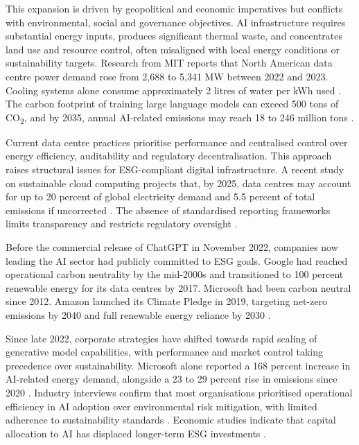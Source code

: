\documentclass[oneside,10pt]{swissi}
\begin{document}
This expansion is driven by geopolitical and economic imperatives but conflicts with environmental, social and governance objectives. AI infrastructure requires substantial energy inputs, produces significant thermal waste, and concentrates land use and resource control, often misaligned with local energy conditions or sustainability targets. Research from MIT reports that North American data centre power demand rose from 2,688 to 5,341 MW between 2022 and 2023. Cooling systems alone consume approximately 2 litres of water per kWh used \cite{mit2025}. The carbon footprint of training large language models can exceed 500 tons of CO\textsubscript{2}, and by 2035, annual AI-related emissions may reach 18 to 246 million tons \cite{wiki2025}.

Current data centre practices prioritise performance and centralised control over energy efficiency, auditability and regulatory decentralisation. This approach raises structural issues for ESG-compliant digital infrastructure. A recent study on sustainable cloud computing projects that, by 2025, data centres may account for up to 20 percent of global electricity demand and 5.5 percent of total emissions if uncorrected \cite{buyya2023}. The absence of standardised reporting frameworks limits transparency and restricts regulatory oversight \cite{fas2025}.

Before the commercial release of ChatGPT in November 2022, companies now leading the AI sector had publicly committed to ESG goals. Google had reached operational carbon neutrality by the mid-2000s and transitioned to 100 percent renewable energy for its data centres by 2017. Microsoft had been carbon neutral since 2012. Amazon launched its Climate Pledge in 2019, targeting net-zero emissions by 2040 and full renewable energy reliance by 2030 \cite{news20,news24,search29}.

Since late 2022, corporate strategies have shifted towards rapid scaling of generative model capabilities, with performance and market control taking precedence over sustainability. Microsoft alone reported a 168 percent increase in AI-related energy demand, alongside a 23 to 29 percent rise in emissions since 2020 \cite{news23,news21}. Industry interviews confirm that most organisations prioritised operational efficiency in AI adoption over environmental risk mitigation, with limited adherence to sustainability standards \cite{search8}. Economic studies indicate that capital allocation to AI has displaced longer-term ESG investments \cite{search18}.
\end{document}

